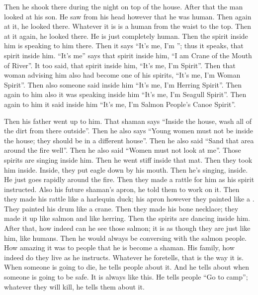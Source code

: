\begin{pairs}
\begin{Rightside}
\pstart
{}Then he shook there during the night on top of the house.
After that the man looked at his son.
He saw from his head however that he was human.
Then again at it, he looked there.
Whatever it is is a human from the waist to the top.
Then at it again, he looked there.
He is just completely human.
Then the spirit inside him is speaking to him there.
Then it says
\qqk{}“It’s me, I’m ”;
thus it speaks, that spirit inside him.
\qqk{}“It’s me” says that spirit inside him,
\qqk{}“I am Crane of the Mouth of  River”.
It too said, that spirit inside him,
\qqk{}“It’s me, I’m  Spirit”.
Then that woman advising him also had become one of his spirits,
\qqk{}“It’s me, I’m Woman Spirit”.
Then also someone said inside him
\qqk{}“It’s me, I’m Herring Spirit”.
Then again to him also it was speaking inside him
\qqk{}“It’s me, I’m Seagull Spirit”.
Then again to him it said inside him
\qqk{}“It’s me, I’m Salmon People’s Canoe Spirit”.
\pend

\pstart
{}Then his father went up to him.
That shaman says
\qqk{}“Inside the house, wash all of the dirt from there outside”.
Then he also says
\qqk{}“Young women must not be inside the house;
they should be in a different house”.
Then he also said
\qqk{}“Sand that area around the fire well”.
Then he also said
\qqk{}“Women must not look at me”.
Those spirits are singing inside him.
Then he went stiff inside that mat.
Then they took him inside.
Inside, they put eagle down by his mouth.
Then he’s singing, inside.
He just goes rapidly around the fire.
Then they made a rattle for him as his spirit instructed.
Also his future shaman’s apron, he told them to work on it.
Then they made his rattle like a harlequin duck;
his apron however they painted like a .
They painted his drum like a crane.
Then they made his bone necklace;
they made it up like salmon and like herring.
Then the spirits are dancing inside him.
After that, how indeed can he see those salmon;
it is as though they are just like him, like humans.
Then he would always be conversing with the salmon people.
How amazing it was to people that he is become a shaman.
His family, how indeed do they live as he instructs.
Whatever he foretells, that is the way it is.
When someone is going to die, he tells people about it.
And he tells about when someone is going to be safe.
It is always like this.
He tells people “Go to camp”;
whatever they will kill, he tells them about it.
\pend


\end{Rightside}
\end{pairs}
